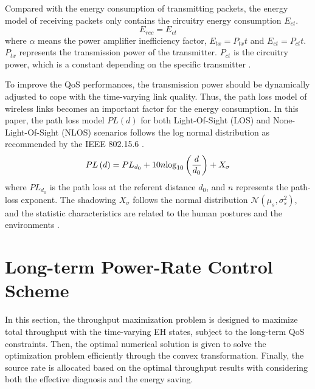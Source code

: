 \documentclass[journal,10pt]{IEEEtran}
\begin{document}
Compared with the energy consumption of transmitting packets, the energy model of receiving packets only contains the circuitry energy consumption $E_{ct}$.
\begin{equation}
E_{rec} = {E_{ct}}
\end{equation}
where $\alpha$ means the power amplifier inefficiency factor, $E_{tx}=P_{tx}t$ and $E_{ct}=P_{ct}t$. $P_{tx}$ represents the transmission power of the transmitter. $P_{ct}$ is the circuitry power, which is a constant depending on the specific transmitter \cite{lin2009asymmetric}. 

To improve the QoS performances, the transmission power should be dynamically adjusted to cope with the time-varying link quality. Thus, the path loss model of wireless links becomes an important factor for the energy consumption. In this paper, the path loss model $PL\left( d \right)$ for both Light-Of-Sight (LOS) and None-Light-Of-Sight (NLOS) scenarios follows the log normal distribution as recommended by the IEEE 802.15.6 \cite{ieee2012WBAN}.
\begin{equation}\label{eq:PL}
\small{
PL\left( d \right) ={PL_{d_0}} + 10n{\log _{10}}\left( {\frac{d}{{{d_0}}}} \right) + {X_\sigma }
}
\end{equation}
where $PL_{d_0}$ is the path loss at the referent distance $d_0$, and $n$ represents the path-loss exponent. The shadowing $X_\sigma$ follows the normal distribution $\mathcal{N}\left( {\mu_{s},\sigma_{s}^2 } \right)$, and the statistic characteristics are related to the human postures and the environments \cite{reusens2009characterization}\cite{d2010statistical}. 

\section{Long-term Power-Rate Control Scheme} \label{sec:PRCS}
In this section, the throughput maximization problem is designed to maximize total throughput with the time-varying EH states, subject to the long-term QoS constraints. Then, the optimal numerical solution is given to solve the optimization problem efficiently through the convex transformation. Finally, the source rate is allocated based on the optimal throughput results with considering both the effective diagnosis and the energy saving.

 
\end{document}

